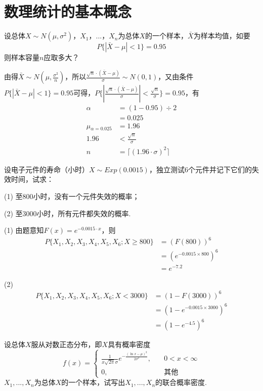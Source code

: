\section{数理统计的基本概念}

   设总体$X \sim N(\mu, \sigma^2)$，$X_{1}$，...，$X_{n}$为总体$X$的一个样本，$\bar{X}$为样本均值，如要
  $$ P\{|\bar{X} - \mu| < 1\} = 0.95 $$
  则样本容量$n$应取多大？

  \xsv
  由得$\bar{X} \sim N(\mu, \frac{\sigma^2}{n})$，所以$\frac{\sqrt{n} \cdot (\bar{X} - \mu)}{\sigma} \sim N(0, 1)$，又由条件$P\{|\bar{X} - \mu| < 1\} = 0.95$可得，$P\{|\frac{\sqrt{n} \cdot (\bar{X} - \mu)}{\sigma}| < \frac{\sqrt{n}}{\sigma}\} = 0.95$，有
  \[ \begin{split}
    \alpha &= (1 - 0.95) \div 2\\
    &= 0.025\\
    \mu{}_{\alpha{}=0.025} &= 1.96\\
    1.96 &< \frac{\sqrt{n}}{\sigma}\\
    n &= \lceil (1.96 \cdot \sigma)^2 \rceil
  \end{split} \]

   设电子元件的寿命（小时）$X \sim Exp(0.0015)$，独立测试6个元件并记下它们的失效时间，试求：

  (1) 至800小时，没有一个元件失效的概率；

  (2) 至3000小时，所有元件都失效的概率.

  \xsv
  (1) 由题意知$F(x) = e^{-0.0015 \cdot x}$，则
  \[ \begin{split}
    P\{X_{1}, X_{2}, X_{3}, X_{4}, X_{5}, X_{6}; X \geq 800\} &= (F(800))^6\\
    &= (e^{-0.0015 \times 800})^6\\
    &= e^{-7.2}
  \end{split} \]

  (2)
  \[ \begin{split}
    P\{X_{1}, X_{2}, X_{3}, X_{4}, X_{5}, X_{6}; X < 3000\} &= (1 - F(3000))^6\\
    &= (1 - e^{-0.0015 \times 3000})^6\\
    &= (1 - e^{-4.5})^6
  \end{split} \]

   设总体$X$服从对数正态分布，即$X$具有概率密度
  \[
    f(x) =
    \begin{cases}
      \frac{1}{x \sqrt{2\pi} \sigma} e^{-\frac{(\ln{x} - \mu)^2}{2 \sigma^2}},\quad &0 < x < \infty\\
      0,\quad &\text{其他}
    \end{cases}
  \]
  $X_1, ..., X_n$为总体$X$的一个样本，试写出$X_1, ...,X_n$的联合概率密度.

